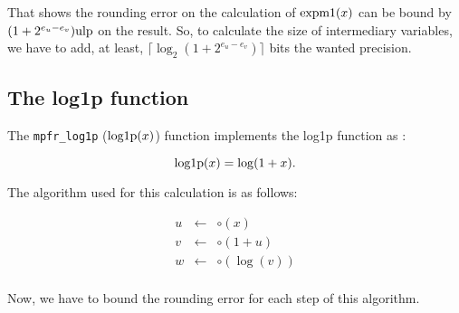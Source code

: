\documentclass[12pt]{amsart}
\def\n{\textnormal}
\def\ulp{{\rm ulp}}
\begin{document}
That shows the rounding error on the calculation of $\n{expm1}(x)$ can be
bound by $(1+2^{e_u-e_v}) \ulp$ on the result. So, to calculate the size of
intermediary variables, we have to add, at least, $\lceil \log_2 (1+2^{e_u-e_v})\rceil$ bits the wanted precision.

\subsection{The log1p function}

The {\tt mpfr\_log1p} ($\n{log1p}(x)$) function implements the log1p function  as :

\[
\textnormal{log1p} (x) = \log(1+x).
\]

The algorithm used for this calculation is as follows:

\begin{eqnarray}\nonumber
u&\leftarrow&\circ(x)\\\nonumber
v&\leftarrow&\circ(1+u)\\\nonumber
w&\leftarrow&\circ(\log(v))\\\nonumber
\end{eqnarray}

Now, we have to bound the rounding error for each step of this
algorithm.
\end{document}

